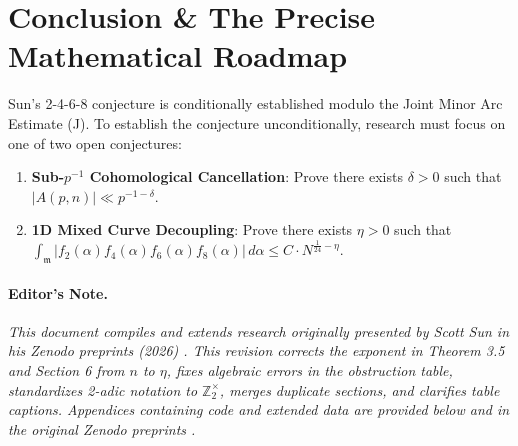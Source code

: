 \documentclass[11pt, a4paper]{article}
\theoremstyle{plain}
\theoremstyle{definition}
\begin{document}
\section{Conclusion \& The Precise Mathematical Roadmap}
\label{sec:conclusion}

Sun's 2-4-6-8 conjecture is conditionally established modulo the Joint Minor Arc Estimate (J). To establish the conjecture unconditionally, research must focus on one of two open conjectures:
\begin{enumerate}
\item \textbf{Sub-$p^{-1}$ Cohomological Cancellation}: Prove there exists $\delta > 0$ such that $|A(p,n)| \ll p^{-1-\delta}$.
\item \textbf{1D Mixed Curve Decoupling}: Prove there exists $\eta > 0$ such that $\int_{\mathfrak{m}} |f_2(\alpha) f_4(\alpha) f_6(\alpha) f_8(\alpha)|\,d\alpha \leq C \cdot N^{\frac{1}{24}-\eta}$.
\end{enumerate}

\paragraph{Editor's Note.} \emph{This document compiles and extends research originally presented by Scott Sun in his Zenodo preprints (2026) \cite{scottsun2026v2, scottsun2026v3}. This revision corrects the exponent in Theorem 3.5 and Section 6 from $n$ to $\eta$, fixes algebraic errors in the obstruction table, standardizes 2-adic notation to $\mathbb{Z}_2^\times$, merges duplicate sections, and clarifies table captions. Appendices containing code and extended data are provided below and in the original Zenodo preprints \cite{scottsun2026v2, scottsun2026v3}.}
\end{document}
